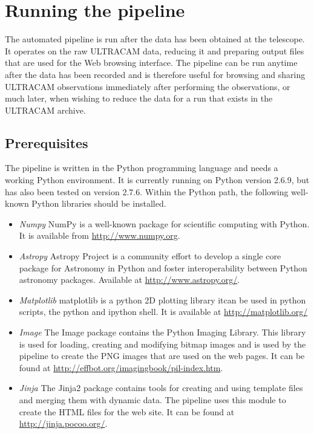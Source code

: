 \section{Running the pipeline}
The automated pipeline is run after the data has been obtained at the telescope. It operates on the raw ULTRACAM data, reducing it and preparing output files that are used for the Web browsing interface. The pipeline can be run anytime after the data has been recorded and is therefore useful for browsing and sharing ULTRACAM observations immediately after performing the observations, or much later, when wishing to reduce the data for a run that exists in the ULTRACAM archive.

\subsection{Prerequisites}
The pipeline is written in the Python programming language and needs a working Python environment. It is currently running on Python version 2.6.9, but has also been tested on version 2.7.6. Within the Python path, the following well-known Python libraries should be installed. 
\begin{itemize}
  \item \emph{Numpy} NumPy is a well-known package for scientific computing with Python. It is available from \url{http://www.numpy.org}.
  \item \emph{Astropy} Astropy Project is a community effort to develop a single core package for Astronomy in Python and foster interoperability between Python astronomy packages. Available at \url{http://www.astropy.org/}.
  \item \emph{Matplotlib} matplotlib is a python 2D plotting library itcan be used in python scripts, the python and ipython shell. It is available at  \url{http://matplotlib.org/}
  \item \emph{Image} The Image package contains the Python Imaging Library. This library is used for loading, creating and modifying bitmap images and is used by the pipeline to create the PNG images that are used on the web pages. It can be found at \url{http://effbot.org/imagingbook/pil-index.htm}.
  \item \emph{Jinja} The Jinja2 package contains tools for creating and using template files and merging them with dynamic data. The pipeline uses this module to create the HTML files for the web site. It can be found at \url{http://jinja.pocoo.org/}.

\end{itemize}
